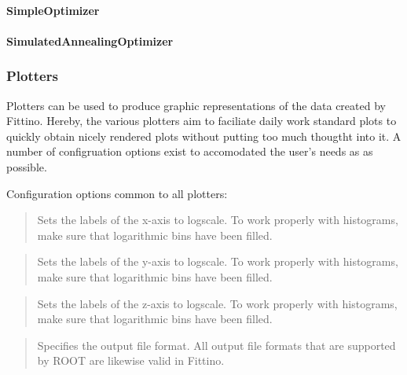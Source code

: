 \documentclass[letterpaper,10pt,english]{sphinxmanual}
\begin{document}



\paragraph{SimpleOptimizer}
\label{simple_optimizer:simpleoptimizer}\label{simple_optimizer::doc}

\paragraph{SimulatedAnnealingOptimizer}
\label{simulated_annealing_optimizer:simulatedannealingoptimizer}\label{simulated_annealing_optimizer::doc}



\subsubsection{Plotters}
\label{plotters:plotters}\label{plotters::doc}
Plotters can be used to produce graphic representations of the data created by Fittino. Hereby, the
various plotters aim to faciliate daily work standard plots to quickly obtain nicely rendered plots
without putting too much thougtht into it. A number of configruation options exist to accomodated
the user's needs as as possible.

Configuration options common to all plotters:

\begin{quote}

Sets the labels of the x-axis to logscale. To work properly with histograms, make sure that
logarithmic bins have been filled.
\end{quote}

\begin{quote}

Sets the labels of the y-axis to logscale. To work properly with histograms, make sure that
logarithmic bins have been filled.
\end{quote}

\begin{quote}

Sets the labels of the z-axis to logscale. To work properly with histograms, make sure that
logarithmic bins have been filled.
\end{quote}

\begin{quote}

Specifies the output file format. All output file formats that are supported by ROOT are likewise
valid in Fittino.
\end{quote}
\end{document}
